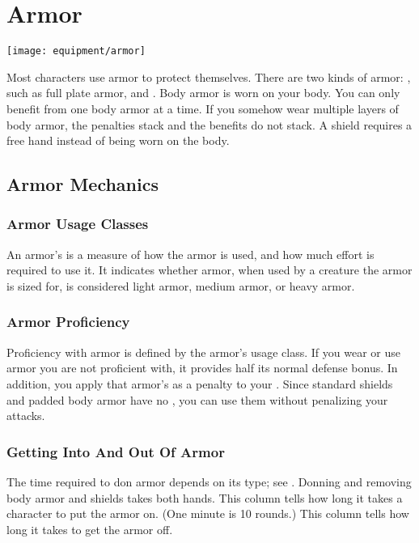       

      \newpage
\section{Armor}\label{Armor}
  \texttt{[image: equipment/armor]}

  Most characters use armor to protect themselves. There are two kinds of armor: , such as full plate armor, and .
  Body armor is worn on your body.
  You can only benefit from one body armor at a time.
  If you somehow wear multiple layers of body armor, the penalties stack and the benefits do not stack.
  A shield requires a free hand instead of being worn on the body.

  \subsection{Armor Mechanics}

    \subsubsection{Armor Usage Classes}\label{Armor Usage Classes}
      An armor's  is a measure of how the armor is used, and how much effort is required to use it.
      It indicates whether armor, when used by a creature the armor is sized for, is considered light armor, medium armor, or heavy armor.

    \subsubsection{Armor Proficiency}\label{Armor Proficiency}
      Proficiency with armor is defined by the armor's usage class.
      If you wear or use armor you are not proficient with, it provides half its normal defense bonus.
      In addition, you apply that armor's  as a penalty to your .
      Since standard shields and padded body armor have no , you can use them without penalizing your attacks.

    \subsubsection{Getting Into And Out Of Armor}
      The time required to don armor depends on its type; see . Donning and removing body armor and shields takes both hands.
       This column tells how long it takes a character to put the armor on. (One minute is 10 rounds.)
       This column tells how long it takes to get the armor off.

